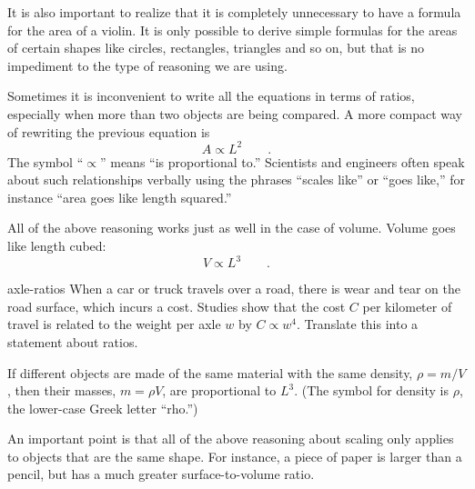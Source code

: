 \vspace{1.5mm}

It is also important to realize that it is completely
unnecessary to have a formula for the area of a violin. It
is only possible to derive simple formulas for the areas of
certain shapes like circles, rectangles, triangles and so
on, but that is no impediment to the type of reasoning we are using.

Sometimes it is inconvenient to write all the equations in
terms of ratios, especially when more than two objects are
being compared. A more compact way of rewriting the
previous equation is
\begin{equation*}
 A \propto L^2 \qquad .
\end{equation*}
The symbol ``$\propto$'' means ``is proportional to.''
Scientists and engineers often speak about such relationships
verbally using the phrases ``scales like'' or ``goes like,''
for instance ``area goes like length squared.''

All of the above reasoning works just as well in the case of
volume. Volume goes like length cubed:
\begin{equation*}
 V \propto L^3 \qquad .
\end{equation*}

\begin{selfcheck}{axle-ratios}
When a car or truck travels over a road, there is wear and tear on the road surface, which incurs a cost.
Studies show that the cost $C$ per kilometer of travel is related to the weight per axle $w$
by $C \propto w^4$.
Translate this into a statement about ratios.
\end{selfcheck}



If different objects are made of the same material with the
same density, $\rho =m/V$, then their masses, $m=\rho V$,
are proportional to $L^3$. (The
symbol for density is $\rho$, the lower-case Greek letter ``rho.'')

An important point is that all of the above reasoning about
scaling only applies to objects that are the same shape. For
instance, a piece of paper is larger than a pencil, but has
a much greater surface-to-volume ratio.

